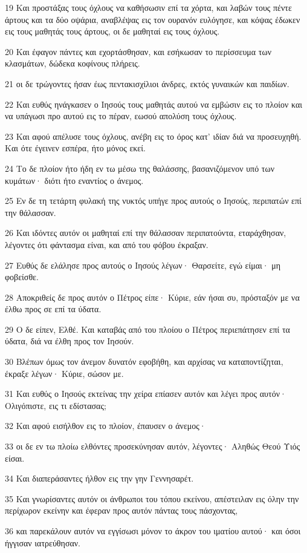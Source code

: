 \par 19 Και προστάξας τους όχλους να καθήσωσιν επί τα χόρτα, και λαβών τους πέντε άρτους και τα δύο οψάρια, αναβλέψας εις τον ουρανόν ευλόγησε, και κόψας έδωκεν εις τους μαθητάς τους άρτους, οι δε μαθηταί εις τους όχλους.
\par 20 Και έφαγον πάντες και εχορτάσθησαν, και εσήκωσαν το περίσσευμα των κλασμάτων, δώδεκα κοφίνους πλήρεις.
\par 21 οι δε τρώγοντες ήσαν έως πεντακισχίλιοι άνδρες, εκτός γυναικών και παιδίων.
\par 22 Και ευθύς ηνάγκασεν ο Ιησούς τους μαθητάς αυτού να εμβώσιν εις το πλοίον και να υπάγωσι προ αυτού εις το πέραν, εωσού απολύση τους όχλους.
\par 23 Και αφού απέλυσε τους όχλους, ανέβη εις το όρος κατ' ιδίαν διά να προσευχηθή. Και ότε έγεινεν εσπέρα, ήτο μόνος εκεί.
\par 24 Το δε πλοίον ήτο ήδη εν τω μέσω της θαλάσσης, βασανιζόμενον υπό των κυμάτων· διότι ήτο εναντίος ο άνεμος.
\par 25 Εν δε τη τετάρτη φυλακή της νυκτός υπήγε προς αυτούς ο Ιησούς, περιπατών επί την θάλασσαν.
\par 26 Και ιδόντες αυτόν οι μαθηταί επί την θάλασσαν περιπατούντα, εταράχθησαν, λέγοντες ότι φάντασμα είναι, και από του φόβου έκραξαν.
\par 27 Ευθύς δε ελάλησε προς αυτούς ο Ιησούς λέγων· Θαρσείτε, εγώ είμαι· μη φοβείσθε.
\par 28 Αποκριθείς δε προς αυτόν ο Πέτρος είπε· Κύριε, εάν ήσαι συ, πρόσταξόν με να έλθω προς σε επί τα ύδατα.
\par 29 Ο δε είπεν, Ελθέ. Και καταβάς από του πλοίου ο Πέτρος περιεπάτησεν επί τα ύδατα, διά να έλθη προς τον Ιησούν.
\par 30 Βλέπων όμως τον άνεμον δυνατόν εφοβήθη, και αρχίσας να καταποντίζηται, έκραξε λέγων· Κύριε, σώσον με.
\par 31 Και ευθύς ο Ιησούς εκτείνας την χείρα επίασεν αυτόν και λέγει προς αυτόν· Ολιγόπιστε, εις τι εδίστασας;
\par 32 Και αφού εισήλθον εις το πλοίον, έπαυσεν ο άνεμος·
\par 33 οι δε εν τω πλοίω ελθόντες προσεκύνησαν αυτόν, λέγοντες· Αληθώς Θεού Υιός είσαι.
\par 34 Και διαπεράσαντες ήλθον εις την γην Γεννησαρέτ.
\par 35 Και γνωρίσαντες αυτόν οι άνθρωποι του τόπου εκείνου, απέστειλαν εις όλην την περίχωρον εκείνην και έφεραν προς αυτόν πάντας τους πάσχοντας,
\par 36 και παρεκάλουν αυτόν να εγγίσωσι μόνον το άκρον του ιματίου αυτού· και όσοι ήγγισαν ιατρεύθησαν.

